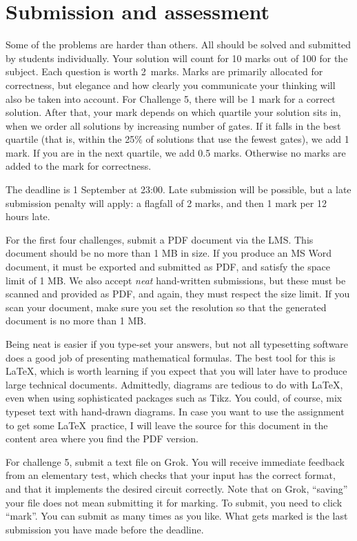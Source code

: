 \documentclass[12pt]{article}
\begin{document}
\section*{Submission and assessment}
Some of the problems are harder than others.
All should be solved and submitted by students individually.
Your solution will count for 10 marks out of 100 for the subject.
Each question is worth 2~marks.
Marks are primarily allocated for correctness, but elegance and how
clearly you communicate your thinking will also be taken into account.
For Challenge 5, there will be 1 mark for a correct solution. 
After that, your mark depends on which quartile your solution sits in, 
when we order all solutions by increasing number of gates.
If it falls in the best quartile (that is, within the 25\% of
solutions that use the fewest gates), we add 1 mark.
If you are in the next quartile, we add 0.5 marks.
Otherwise no marks are added to the mark for correctness.

The deadline is 1 September at 23:00.
Late submission will be possible, but a late submission penalty will
apply: a flagfall of 2 marks, and then 1 mark per 12 hours late.

For the first four challenges, submit a PDF document via the LMS.
This document should be no more than 1 MB in size.
If you produce an MS Word document, it must be exported
and submitted as PDF, and satisfy the space limit of 1 MB.
We also accept \emph{neat} hand-written submissions, but these must be
scanned and provided as PDF, and again, they must respect the size limit.
If you scan your document, make sure you set the resolution so that
the generated document is no more than 1 MB.

Being neat is easier if you type-set your answers, but not all
typesetting software does a good job of presenting mathematical formulas.
The best tool for this is \LaTeX, which is worth learning if you expect
that you will later have to produce large technical documents.
Admittedly, diagrams are tedious to do with \LaTeX,
even when using sophisticated packages such as Tikz.
You could, of course, mix typeset text with hand-drawn diagrams.
In case you want to use the assignment to get some \LaTeX\ practice,
I will leave the source for this document in the
content area where you find the PDF version.

For challenge 5, submit a text file on Grok.
You will receive immediate feedback from an elementary test,
which checks that your input has the correct format, and that it implements
the desired circuit correctly.
Note that on Grok, ``saving'' your file does not mean submitting it
for marking. 
To submit, you need to click ``mark''.
You can submit as many times as you like.
What gets marked is the last submission you have made before the deadline.
\end{document}
